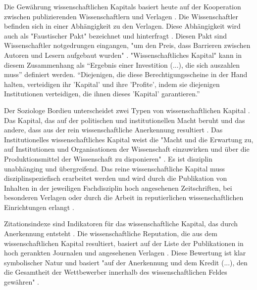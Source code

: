 Die Gewährung wissenschaftlichen Kapitals basiert heute auf der Kooperation zwischen publizierenden Wissenschaftlern und Verlagen \cite{herb_2006}. Die Wissenschaftler befinden sich in einer Abhängigkeit zu den Verlagen. Diese Abhängigkeit wird auch als "Faustischer Pakt" bezeichnet und hinterfragt \cite{hagner_2015_sache_buches} \cite{Parks_2002_acadamic_faust}. Diesen Pakt sind Wissenschaftler notgedrungen eingangen, "um den Preis, dass Barrieren zwischen Autoren und Lesern aufgebaut wurden" \cite{hagner_2015_sache_buches}. "Wissenschaftliches Kapital" kann in diesem Zusammenhang als “Ergebnis einer Investition (...), die sich auszahlen muss” \cite{herb_2006} definiert werden. “Diejenigen, die diese Berechtigungsscheine in der Hand halten, verteidigen ihr 'Kapital' und ihre 'Profite', indem sie diejenigen Institutionen verteidigen, die ihnen dieses 'Kapital' garantieren.” \cite{Bourdieu_1992}

Der Soziologe Bordieu unterscheidet zwei Typen von wissenschaftlichen Kapital \cite{Bourdieu_1998}. Das Kapital, das auf der politischen und institutionellen Macht beruht und das andere, dass aus der rein wissenschaftliche Anerkennung resultiert \cite{mikl_2010_soziologie}. Das Institutionelles wissenschaftliches Kapital weist die "Macht und die Erwartung zu, auf Institutionen und Organisationen der Wissenschaft einzuwirken und über die Produktionsmittel der Wissenschaft zu disponieren" \cite[:257]{Barl_sius_2008}. Es ist disziplin unabhänging und übergreifend. Das reine wissenschaftliche Kapital muss disziplinspeziefisch erarbeitet werden und wird durch die Publikation von Inhalten in der jeweiligen Fachdisziplin hoch angesehenen Zeitschriften, bei besonderen Verlagen oder durch die Arbeit in reputierlichen wissenschaftlichen Einrichtungen erlangt \cite[:257]{Barl_sius_2008}.

Zitationsindexe sind Indikatoren für das wissenschaftliche Kapital, das durch Anerkennung entsteht \cite{Bourdieu_1998}. Die wissenschaftliche Reputation, die aus dem wissenschaftlichen Kapital resultiert, basiert auf der Liste der Publikationen in hoch gerankten Journalen und angesehenen Verlagen \cite{herb_2010}. Diese Bewertung ist klar symbolischer Natur und basiert "auf der Anerkennung und dem Kredit (...), den die Gesamtheit der Wettbewerber innerhalb des wissenschaftlichen Feldes gewähren" \cite{Bourdieu_1998} \cite{Barl_sius_2008} \cite{herb_2010}.

